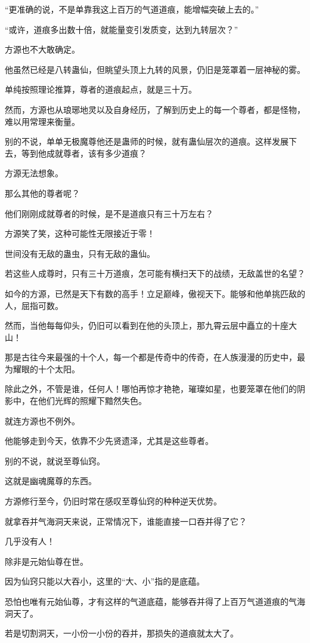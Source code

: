 \begin{this_body}
“更准确的说，不是单靠我这上百万的气道道痕，能增幅突破上去的。”

“或许，道痕多出数十倍，就能量变引发质变，达到九转层次？”

方源也不大敢确定。

他虽然已经是八转蛊仙，但眺望头顶上九转的风景，仍旧是笼罩着一层神秘的雾。

单纯按照理论推算，尊者的道痕起点，就是三十万。

然而，方源也从琅琊地灵以及自身经历，了解到历史上的每一个尊者，都是怪物，难以用常理来衡量。

别的不说，单单无极魔尊他还是蛊师的时候，就有蛊仙层次的道痕。这样发展下去，等到他成就尊者，该有多少道痕？

方源无法想象。

那么其他的尊者呢？

他们刚刚成就尊者的时候，是不是道痕只有三十万左右？

方源笑了笑，这种可能性无限接近于零！

世间没有无敌的蛊虫，只有无敌的蛊仙。

若这些人成尊时，只有三十万道痕，怎可能有横扫天下的战绩，无敌盖世的名望？

如今的方源，已然是天下有数的高手！立足巅峰，傲视天下。能够和他单挑匹敌的人，屈指可数。

然而，当他每每仰头，仍旧可以看到在他的头顶上，那九霄云层中矗立的十座大山！

那是古往今来最强的十个人，每一个都是传奇中的传奇，在人族漫漫的历史中，最为耀眼的十个太阳。

除此之外，不管是谁，任何人！哪怕再惊才艳艳，璀璨如星，也要笼罩在他们的阴影中，在他们光辉的照耀下黯然失色。

就连方源也不例外。

他能够走到今天，依靠不少先贤遗泽，尤其是这些尊者。

别的不说，就说至尊仙窍。

这就是幽魂魔尊的东西。

方源修行至今，仍旧时常在感叹至尊仙窍的种种逆天优势。

就拿吞并气海洞天来说，正常情况下，谁能直接一口吞并得了它？

几乎没有人！

除非是元始仙尊在世。

因为仙窍只能以大吞小，这里的“大、小”指的是底蕴。

恐怕也唯有元始仙尊，才有这样的气道底蕴，能够吞并得了上百万气道道痕的气海洞天了。

若是切割洞天，一小份一小份的吞并，那损失的道痕就太大了。


\end{this_body}
